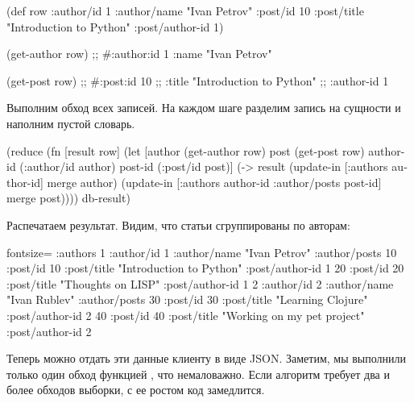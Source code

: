 \begin{english}
  \begin{clojure}
(def row
  {:author/id 1
   :author/name "Ivan Petrov"
   :post/id 10
   :post/title "Introduction to Python"
   :post/author-id 1})

(get-author row)
;; #:author{:id 1 :name "Ivan Petrov"}

(get-post row)
;; #:post{:id 10
;;        :title "Introduction to Python"
;;        :author-id 1}
  \end{clojure}
\end{english}

Выполним обход всех записей. На каждом шаге разделим запись на сущности и наполним пустой словарь.

\begin{english}
  \begin{clojure}
(reduce
 (fn [result row]
   (let [author    (get-author row)
         post      (get-post row)
         author-id (:author/id author)
         post-id   (:post/id post)]
     (-> result
         (update-in [:authors author-id]
                    merge author)
         (update-in [:authors author-id
                     :author/posts post-id]
                    merge post))))
 {}
 db-result)
  \end{clojure}
\end{english}

Распечатаем результат. Видим, что статьи сгруппированы по авторам:

\begin{english}
  \begin{clojure*}{fontsize=\small}
{:authors
 {1 {:author/id 1
     :author/name "Ivan Petrov"
     :author/posts
       {10 {:post/id 10
            :post/title "Introduction to Python"
            :post/author-id 1}
        20 {:post/id 20
            :post/title "Thoughts on LISP"
            :post/author-id 1}}}
  2 {:author/id 2
     :author/name "Ivan Rublev"
     :author/posts
       {30 {:post/id 30
            :post/title "Learning Clojure"
            :post/author-id 2}
        40 {:post/id 40
            :post/title "Working on my pet project"
            :post/author-id 2}}}}}
  \end{clojure*}
\end{english}

Теперь можно отдать эти данные клиенту в виде JSON. Заметим, мы выполнили только один обход функцией , что немаловажно. Если алгоритм требует два и более обходов выборки, с ее ростом код замедлится.

